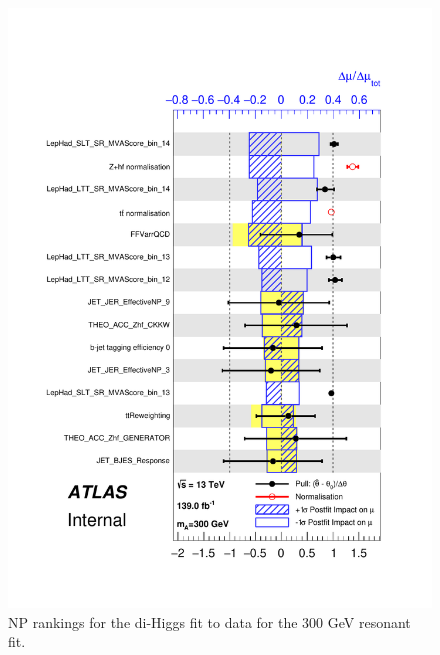 \begin{figure}
\centering
\includegraphics[width=.8\textwidth]{figures/results/HH/LepHad/pulls_SigXsecOverSM_300.pdf}
\caption{NP rankings for the di-Higgs \lephad fit to data for the 300 GeV resonant fit.}
\label{fig:LepHadPostfitNPRankings2HDM300}
\end{figure}

